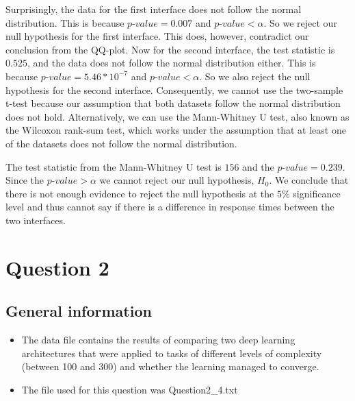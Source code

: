 \documentclass[a4paper]{article}
\begin{document}
Surprisingly, the data for the first interface does not follow the normal distribution. This is because $p$-$value = 0.007$ and $p$-$value < \alpha$. So we reject our null hypothesis for the first interface. This does, however, contradict our conclusion from the QQ-plot.
Now for the second interface, the test statistic is $0.525$, and the data does not follow the normal distribution either. This is because $p$-$value = 5.46 * 10^{-7}$ and $p$-$value < \alpha$. So we also reject the null hypothesis for the second interface. Consequently, we cannot use the two-sample t-test because our assumption that both datasets follow the normal distribution does not hold. Alternatively, we can use the Mann-Whitney U test, also known as the Wilcoxon rank-sum test, which works under the assumption that at least one of the datasets does not follow the normal distribution.
The test statistic from the Mann-Whitney U test is $156$ and the $p$-$value = 0.239$. Since the $p$-$value > \alpha$ we cannot reject our null hypothesis, $H_0$. We conclude that there is not enough evidence to reject the null hypothesis at the $5\%$ significance level and thus cannot say if there is a difference in response times between the two interfaces.
\section{Question 2}
\subsection{General information}
\begin{itemize}
    \item The data file contains the results of comparing two deep learning architectures that were applied to tasks of different levels of complexity (between 100 and 300) and whether the learning managed to converge.
    \item The file used for this question was Question2\_4.txt
\end{itemize}
\end{document}
